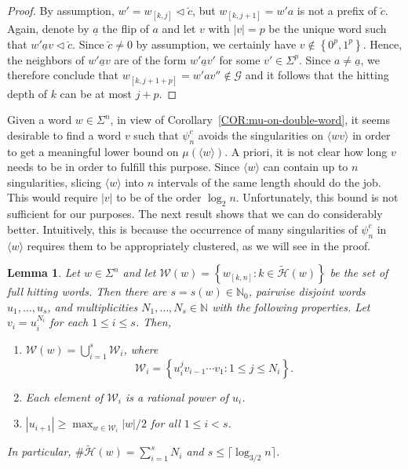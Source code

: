 \documentclass[11pt,reqno]{amsart}
\theoremstyle{plain}
\newtheorem{lemma}[theorem]{Lemma}
\theoremstyle{definition}
\newcommand{\N}{{\mathbb N}}
\newcommand{\mc}{\mathcal}
\begin{document}
\begin{proof}
By assumption, $w' = w_{[k,j]} \triangleleft \breve{c}$, but $w_{[k,j+1]} = w'a$ is not a prefix of $\breve{c}$. Again, denote by $\underline{a}$ the flip of $a$
and let $v$ with $|v| = p$ be the unique word such that $w'\underline{a}v \triangleleft \breve{c}$. Since $\breve{c} \neq 0$ by assumption, we certainly have $v \notin \left\{0^p, 1^p\right\}$. Hence, the neighbors of $w'\underline{a}v$ are of the form $w'\underline{a}v'$ for some $v' \in \Sigma^p$. Since $a\neq \underline{a}$, we therefore conclude that $w_{[k,j+1+p]} = w'a v'' \notin \mc G$ and it follows that the hitting depth of $k$ can be at most $j+p$.
\end{proof}







Given a word $w \in \Sigma^n$, in view of Corollary~\ref{COR:mu-on-double-word}, it seems desirable to find a word $v$ such that $\psi^c_n$ avoids the singularities on $\langle wv\rangle$ in order to get a meaningful lower bound on $\mu(\langle w \rangle)$. A priori, it is not clear how long $v$ needs to be in order to fulfill this purpose. Since $\langle w \rangle$ can contain up to $n$ singularities, slicing $\langle w \rangle$ into $n$ intervals of the same length should do the job. This would require $|v|$ to be of the order $\log_2 n$. Unfortunately, this bound is not sufficient for our purposes. The next result shows that we can do considerably better. Intuitively, this is because the occurrence of many singularities of $\psi_n^c$ in $\langle w \rangle$ requires them to be appropriately clustered, as we will see in the proof.




\begin{lemma}
\label{LEM:hitting-word-structure}
Let $w \in \Sigma^n$ and let $\mc W(w) = \left\{ w_{[k,n]} : k \in \widetilde{\mc H}(w) \right\}$ be the set of full hitting words. Then there are $s = s(w) \in \N_0$, pairwise disjoint words $u_1, \ldots, u_s$, and multiplicities 
$N_1, \ldots, N_s \in \N$ with the following properties. Let $v_i = u_i^{N_i}$ for each $1\leqslant i \leqslant s$. Then,

\begin{enumerate}
\item\label{en: 1} $\mc W(w) = \bigcup_{i=1}^s \mc W_i$, where
\[
\mc W_i = \left\{ u_i^j v_{i-1} \cdots v_1: 1 \leqslant j \leqslant N_{i} \right\}.
\]
\item\label{en: 2} Each element of $\mc W_i$ is a rational power of $u_i$.
\item\label{en: 3} $|u_{i+1}| \geqslant \max_{w \in \mc W_i}|w|/2$ for all $1\leqslant i < s$.
\end{enumerate}
In particular, $\# \widetilde{\mc H}(w) = \sum_{i=1}^s N_i$ and $s \leqslant \lceil \log_{3/2} n \rceil$.
\end{lemma}
\end{document}
